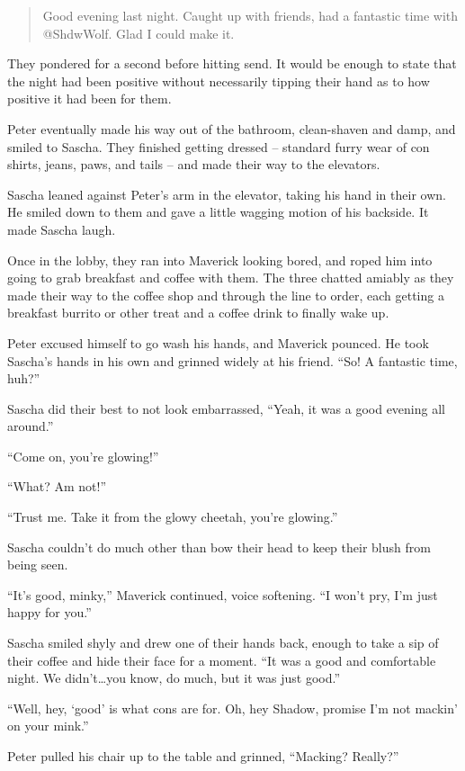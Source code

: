 \documentclass[12pt,letterpaper,oneside]{memoir}
\begin{document}
  \begin{quote}
    Good evening last night. Caught up with friends, had a fantastic time with @ShdwWolf. Glad I could make it.
  \end{quote}

  They pondered for a second before hitting send. It would be enough to state that the night had been positive without necessarily tipping their hand as to how positive it had been for them.

  Peter eventually made his way out of the bathroom, clean-shaven and damp, and smiled to Sascha. They finished getting dressed -- standard furry wear of con shirts, jeans, paws, and tails -- and made their way to the elevators.

  Sascha leaned against Peter's arm in the elevator, taking his hand in their own. He smiled down to them and gave a little wagging motion of his backside. It made Sascha laugh.

  Once in the lobby, they ran into Maverick looking bored, and roped him into going to grab breakfast and coffee with them. The three chatted amiably as they made their way to the coffee shop and through the line to order, each getting a breakfast burrito or other treat and a coffee drink to finally wake up.

  Peter excused himself to go wash his hands, and Maverick pounced. He took Sascha's hands in his own and grinned widely at his friend. ``So! A fantastic time, huh?''

  Sascha did their best to not look embarrassed, ``Yeah, it was a good evening all around.''

  ``Come on, you're glowing!''

  ``What? Am not!''

  ``Trust me. Take it from the glowy cheetah, you're glowing.''

  Sascha couldn't do much other than bow their head to keep their blush from being seen.

  ``It's good, minky,'' Maverick continued, voice softening. ``I won't pry, I'm just happy for you.''

  Sascha smiled shyly and drew one of their hands back, enough to take a sip of their coffee and hide their face for a moment. ``It was a good and comfortable night. We didn't\ldots{}you know, do much, but it was just good.''

  ``Well, hey, `good' is what cons are for. Oh, hey Shadow, promise I'm not mackin' on your mink.''

  Peter pulled his chair up to the table and grinned, ``Macking? Really?''
\end{document}
